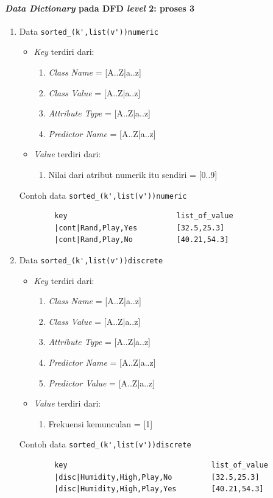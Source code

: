 \paragraph{\textit{Data Dictionary} pada DFD \textit{level} 2: proses 3}
\begin{enumerate}
	\item{Data \verb|sorted_(k',list(v'))numeric|}
	\begin{itemize}
		\item \textit{Key} terdiri dari:
		\begin{enumerate}
			\item \textit{Class Name} = [A..Z|a..z] 
			\item \textit{Class Value} = [A..Z|a..z] 
			\item \textit{Attribute Type} = [A..Z|a..z] 
			\item \textit{Predictor Name} = [A..Z|a..z] 
		\end{enumerate}
		\item \textit{Value} terdiri dari:
		\begin{enumerate}
			\item Nilai dari atribut numerik itu sendiri = [0..9]
		\end{enumerate}
	\end{itemize}
	Contoh data \verb|sorted_(k',list(v'))numeric|
	\begin{lstlisting}
		key							list_of_value
		|cont|Rand,Play,Yes			[32.5,25.3]
		|cont|Rand,Play,No			[40.21,54.3]
	\end{lstlisting}
	
	\item{Data \verb|sorted_(k',list(v'))discrete|}
	\begin{itemize}
		\item \textit{Key} terdiri dari:
		\begin{enumerate}
			\item \textit{Class Name} = [A..Z|a..z] 
			\item \textit{Class Value} = [A..Z|a..z] 
			\item \textit{Attribute Type} = [A..Z|a..z] 
			\item \textit{Predictor Name} = [A..Z|a..z] 
			\item \textit{Predictor Value} = [A..Z|a..z] 
		\end{enumerate}
		\item \textit{Value} terdiri dari:
		\begin{enumerate}
			\item Frekuensi kemunculan = [1]
		\end{enumerate}
	\end{itemize}
	Contoh data \verb|sorted_(k',list(v'))discrete|
	\begin{lstlisting}
		key									list_of_value
		|disc|Humidity,High,Play,No			[32.5,25.3]
		|disc|Humidity,High,Play,Yes		[40.21,54.3]
	\end{lstlisting}
	

\end{enumerate}
